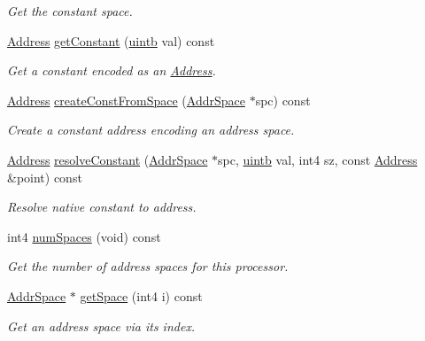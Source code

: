 \begin{DoxyCompactItemize}
\begin{DoxyCompactList}\small\item\em Get the constant space. \end{DoxyCompactList}\item 
\mbox{\hyperlink{class_address}{Address}} \mbox{\hyperlink{class_addr_space_manager_aadd44852a41fe18966cce35b5abd15de}{get\+Constant}} (\mbox{\hyperlink{types_8h_a2db313c5d32a12b01d26ac9b3bca178f}{uintb}} val) const
\begin{DoxyCompactList}\small\item\em Get a constant encoded as an \mbox{\hyperlink{class_address}{Address}}. \end{DoxyCompactList}\item 
\mbox{\hyperlink{class_address}{Address}} \mbox{\hyperlink{class_addr_space_manager_a5dc6c782b2b4c4c300aaa491e40719b8}{create\+Const\+From\+Space}} (\mbox{\hyperlink{class_addr_space}{Addr\+Space}} $\ast$spc) const
\begin{DoxyCompactList}\small\item\em Create a constant address encoding an address space. \end{DoxyCompactList}\item 
\mbox{\hyperlink{class_address}{Address}} \mbox{\hyperlink{class_addr_space_manager_a346fe23bba76b07c9fe7ddea82995e1f}{resolve\+Constant}} (\mbox{\hyperlink{class_addr_space}{Addr\+Space}} $\ast$spc, \mbox{\hyperlink{types_8h_a2db313c5d32a12b01d26ac9b3bca178f}{uintb}} val, int4 sz, const \mbox{\hyperlink{class_address}{Address}} \&point) const
\begin{DoxyCompactList}\small\item\em Resolve native constant to address. \end{DoxyCompactList}\item 
int4 \mbox{\hyperlink{class_addr_space_manager_ae2d22102a7ce6080918e82daafabbdfa}{num\+Spaces}} (void) const
\begin{DoxyCompactList}\small\item\em Get the number of address spaces for this processor. \end{DoxyCompactList}\item 
\mbox{\hyperlink{class_addr_space}{Addr\+Space}} $\ast$ \mbox{\hyperlink{class_addr_space_manager_ad1a9a620e767ffe8bd929913f882e2a4}{get\+Space}} (int4 i) const
\begin{DoxyCompactList}\small\item\em Get an address space via its index. \end{DoxyCompactList}\item 

\end{DoxyCompactItemize}
